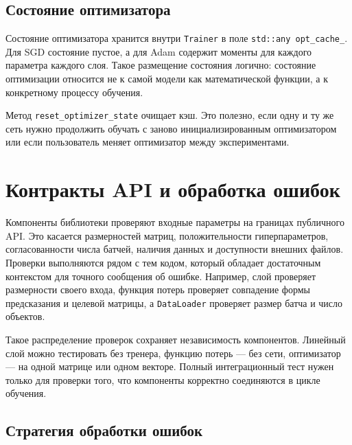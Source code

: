 \documentclass{article}
\begin{document}
\subsection{Состояние оптимизатора}

Состояние оптимизатора хранится внутри \texttt{Trainer} в поле
\texttt{std::any opt\_cache\_}. Для SGD состояние пустое, а для Adam
содержит моменты для каждого параметра каждого слоя. Такое размещение
состояния логично: состояние оптимизации относится не к самой модели
как математической функции, а к конкретному процессу обучения.

Метод \texttt{reset\_optimizer\_state} очищает кэш. Это полезно, если
одну и ту же сеть нужно продолжить обучать с заново инициализированным
оптимизатором или если пользователь меняет оптимизатор между
экспериментами.

\section{Контракты API и обработка ошибок}

Компоненты библиотеки проверяют входные параметры на границах
публичного API. Это касается размерностей матриц, положительности
гиперпараметров, согласованности числа батчей, наличия данных и
доступности внешних файлов. Проверки выполняются рядом с тем кодом,
который обладает достаточным контекстом для точного сообщения об
ошибке. Например, слой проверяет размерности своего входа, функция
потерь проверяет совпадение формы предсказания и целевой матрицы, а
\texttt{DataLoader} проверяет размер батча и число объектов.

Такое распределение проверок сохраняет независимость компонентов.
Линейный слой можно тестировать без тренера, функцию потерь --- без
сети, оптимизатор --- на одной матрице или одном векторе. Полный
интеграционный тест нужен только для проверки того, что компоненты
корректно соединяются в цикле обучения.

\subsection{Стратегия обработки ошибок}
\end{document}
